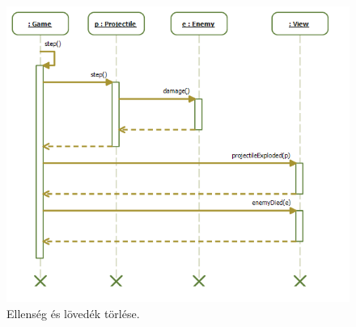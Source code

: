 \begin{figure}[H]
\begin{center}
\includegraphics[width=18cm]{images/grafikaSeq/proj_Enemy_del.png}
\caption{Ellenség és lövedék törlése.}
\label{fig:Graphic_enemy/projectile_del}
\end{center}
\end{figure}